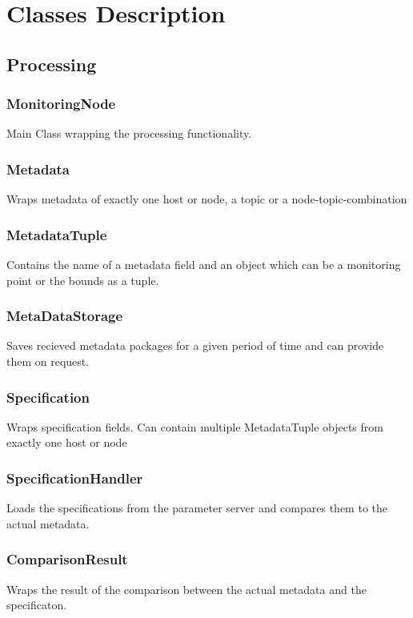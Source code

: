 \chapter{Classes Description}

\section{Processing}

\subsection{MonitoringNode}
Main Class wrapping the processing functionality.

\subsection{Metadata}
Wraps metadata of exactly one host or node, a topic or a node-topic-combination

\subsection{MetadataTuple}
Contains the name of a metadata field and an object which can be a monitoring point or the bounds as a tuple.

\subsection{MetaDataStorage}
Saves recieved metadata packages for a given period of time and can provide them on request.

\subsection{Specification}
Wraps specification fields. Can contain multiple MetadataTuple objects from exactly one host or node

\subsection{SpecificationHandler}
Loads the specifications from the parameter server and compares them to the actual metadata.

\subsection{ComparisonResult}
Wraps the result of the comparison between the actual metadata and the specificaton.

